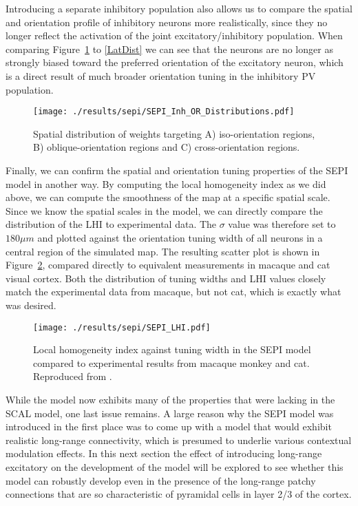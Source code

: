 Introducing a separate inhibitory population also allows us to compare
the spatial and orientation profile of inhibitory neurons more
realistically, since they no longer reflect the activation of the
joint excitatory/inhibitory population. When comparing
Figure~\ref{SEPI_OR_Distributions} to \ref{LatDist} we can see
that the neurons are no longer as strongly biased toward the preferred
orientation of the excitatory neuron, which is a direct result of much
broader orientation tuning in the inhibitory PV population.

\begin{figure}
	\centering
        \texttt{[image: ./results/sepi/SEPI\_Inh\_OR\_Distributions.pdf]}
	\caption{Spatial distribution of weights targeting A)
      iso-orientation regions, B) oblique-orientation regions and C)
      cross-orientation regions.}
	\label{SEPI_OR_Distributions}
\end{figure}

Finally, we can confirm the spatial and orientation tuning properties
of the SEPI model in another way. By computing the local homogeneity
index as we did above, we can compute the smoothness of the map at a
specific spatial scale. Since we know the spatial scales in the model,
we can directly compare the distribution of the LHI to experimental
data. The $\sigma$ value was therefore set to $180 \mu m$ and plotted
against the orientation tuning width of all neurons in a central
region of the simulated map. The resulting scatter plot is shown in
Figure~\ref{SEPILHI}, compared directly to equivalent measurements in
macaque and cat visual cortex. Both the distribution of tuning widths
and LHI values closely match the experimental data from macaque, but
not cat, which is exactly what was desired.

\begin{figure}
	\centering
        \texttt{[image: ./results/sepi/SEPI\_LHI.pdf]}
	\caption{Local homogeneity index against tuning width in the SEPI
      model compared to experimental results from macaque monkey and
      cat. Reproduced from \cite{Nauhaus2008}.}
	\label{SEPILHI}
\end{figure}

While the model now exhibits many of the properties that were lacking
in the SCAL model, one last issue remains. A large reason why the SEPI
model was introduced in the first place was to come up with a model
that would exhibit realistic long-range connectivity, which is
presumed to underlie various contextual modulation effects. In this
next section the effect of introducing long-range excitatory on the
development of the model will be explored to see whether this model
can robustly develop even in the presence of the long-range patchy
connections that are so characteristic of pyramidal cells in layer 2/3
of the cortex.

